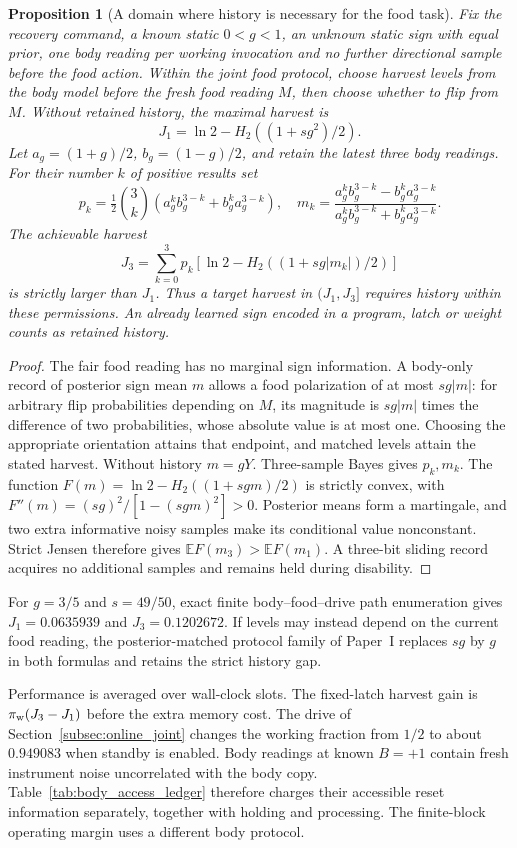 \documentclass[12pt]{article}
\newtheorem{proposition}[theorem]{Proposition}
\theoremstyle{definition}
\newcommand{\E}{\mathbb E}
\begin{document}
\begin{proposition}[A domain where history is necessary for the food task]
\label{prop:body_memory_value}
Fix the recovery command, a known static $0<g<1$, an unknown static sign with equal prior, one body reading per working invocation and no further directional sample before the food action. Within the joint food protocol, choose harvest levels from the body model before the fresh food reading $M$, then choose whether to flip from $M$. Without retained history, the maximal harvest is
\[
 J_1=\ln2-H_2((1+s g^2)/2).
\]
Let $a_g=(1+g)/2$, $b_g=(1-g)/2$, and retain the latest three body readings. For their number $k$ of positive results set
\[
 p_k=\tfrac12\binom3k(a_g^kb_g^{3-k}+b_g^ka_g^{3-k}),
 \quad m_k=\frac{a_g^kb_g^{3-k}-b_g^ka_g^{3-k}}
 {a_g^kb_g^{3-k}+b_g^ka_g^{3-k}}.
\]
The achievable harvest
\[
 J_3=\sum_{k=0}^3p_k[\ln2-H_2((1+s g|m_k|)/2)]
\]
is strictly larger than $J_1$. Thus a target harvest in $(J_1,J_3]$ requires history within these permissions. An already learned sign encoded in a program, latch or weight counts as retained history.
\end{proposition}
\begin{proof}
The fair food reading has no marginal sign information. A body-only record of posterior sign mean $m$ allows a food polarization of at most $s g|m|$: for arbitrary flip probabilities depending on $M$, its magnitude is $s g|m|$ times the difference of two probabilities, whose absolute value is at most one. Choosing the appropriate orientation attains that endpoint, and matched levels attain the stated harvest. Without history $m=gY$. Three-sample Bayes gives $p_k,m_k$. The function $F(m)=\ln2-H_2((1+s gm)/2)$ is strictly convex, with $F''(m)=(s g)^2/[1-(s gm)^2]>0$. Posterior means form a martingale, and two extra informative noisy samples make its conditional value nonconstant. Strict Jensen therefore gives $\E F(m_3)>\E F(m_1)$. A three-bit sliding record acquires no additional samples and remains held during disability.
\end{proof}

For $g=3/5$ and $s=49/50$, exact finite body--food--drive path enumeration gives $J_1=0.0635939$ and $J_3=0.1202672$. If levels may instead depend on the current food reading, the posterior-matched protocol family of Paper~I replaces $s g$ by $g$ in both formulas and retains the strict history gap.

Performance is averaged over wall-clock slots. The fixed-latch harvest gain is $\pi_{\rm w}(J_3-J_1)$ before the extra memory cost. The drive of Section~\ref{subsec:online_joint} changes the working fraction from $1/2$ to about $0.949083$ when standby is enabled. Body readings at known $B=+1$ contain fresh instrument noise uncorrelated with the body copy. Table~\ref{tab:body_access_ledger} therefore charges their accessible reset information separately, together with holding and processing. The finite-block operating margin uses a different body protocol.
\end{document}
